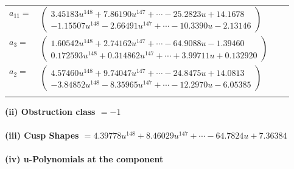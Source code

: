 \documentclass[1p]{elsarticle_modified}
\theoremstyle{definition}
\begin{document}
\begin{tabular}{m{7pt} m{180pt} m{7pt} m{180pt} }
\flushright $a_{11}=$&$\begin{pmatrix}3.45183 u^{148}+7.86190 u^{147}+\cdots-25.2823 u+14.1678\\-1.15507 u^{148}-2.66491 u^{147}+\cdots-10.3390 u-2.13146\end{pmatrix}$ \\
\flushright $a_{3}=$&$\begin{pmatrix}1.60542 u^{148}+2.74162 u^{147}+\cdots-64.9088 u-1.39460\\0.172593 u^{148}+0.314862 u^{147}+\cdots+3.99711 u+0.132920\end{pmatrix}$ \\
\flushright $a_{2}=$&$\begin{pmatrix}4.57460 u^{148}+9.74047 u^{147}+\cdots-24.8475 u+14.0813\\-3.84852 u^{148}-8.35965 u^{147}+\cdots-12.2970 u-6.05385\end{pmatrix}$\\&\end{tabular}
\flushleft \textbf{(ii) Obstruction class $= -1$}\\~\\
\flushleft \textbf{(iii) Cusp Shapes $= 4.39778 u^{148}+8.46029 u^{147}+\cdots-64.7824 u+7.36384$}\\~\\
\newpage\renewcommand{\arraystretch}{1}
\flushleft \textbf{(iv) u-Polynomials at the component}\newline \\
\end{document}
